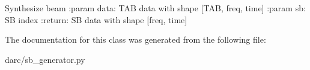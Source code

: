 \begin{DoxyVerb}Synthesize beam
:param data: TAB data with shape [TAB, freq, time]
:param sb: SB index
:return: SB data with shape [freq, time]
\end{DoxyVerb}
 

The documentation for this class was generated from the following file\+:\begin{DoxyCompactItemize}
\item 
darc/sb\+\_\+generator.\+py\end{DoxyCompactItemize}
